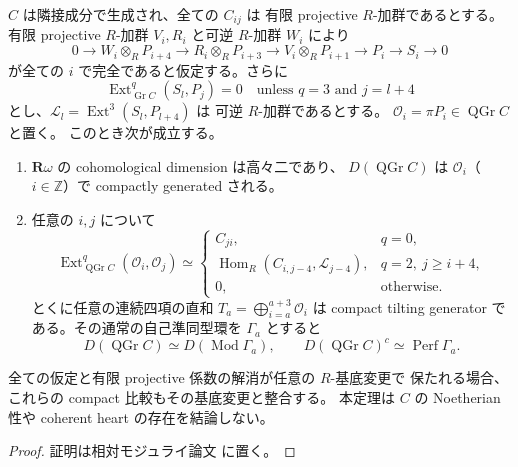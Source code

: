 \begin{theorem}
\label{thm:relative-cubic-tails-tilting}
$C$ は隣接成分で生成され、全ての $C_{ij}$ は
有限 projective $R$-加群であるとする。
有限 projective $R$-加群 $V_i,R_i$ と可逆 $R$-加群 $W_i$ により
\[
 0\longrightarrow W_i\otimes_RP_{i+4}
 \longrightarrow R_i\otimes_RP_{i+3}
 \longrightarrow V_i\otimes_RP_{i+1}
 \longrightarrow P_i\longrightarrow S_i\longrightarrow0
 \tag{CT-res}\label{eq:cubic-tails-simple-resolution}
\]
が全ての $i$ で完全であると仮定する。さらに
\[
 \operatorname{Ext}^q_{\operatorname{Gr}C}(S_l,P_j)=0
 \quad\text{unless }q=3\text{ and }j=l+4
 \tag{CT-dual}\label{eq:cubic-tails-relative-dual}
\]
とし、$\mathcal L_l=\operatorname{Ext}^3(S_l,P_{l+4})$ は
可逆 $R$-加群であるとする。
$\mathcal O_i=\pi P_i\in\operatorname{QGr}C$ と置く。
このとき次が成立する。
\begin{enumerate}
\item $\mathbf R\omega$ の cohomological dimension は高々二であり、
  $D(\operatorname{QGr}C)$ は $\mathcal O_i$（$i\in\mathbb Z$）で
  compactly generated される。
\item 任意の $i,j$ について
  \[
  \operatorname{Ext}^q_{\operatorname{QGr}C}
       (\mathcal O_i,\mathcal O_j)
   \simeq
   \begin{cases}
     C_{ji},&q=0,\\
     \operatorname{Hom}_R(C_{i,j-4},\mathcal L_{j-4}),&q=2,\ j\ge i+4,\\
     0,&\text{otherwise}.
   \end{cases}
  \tag{CT-coh}\label{eq:cubic-tails-line-cohomology}
  \]
  とくに任意の連続四項の直和
  $T_a=\bigoplus_{i=a}^{a+3}\mathcal O_i$ は compact tilting generator
  である。その通常の自己準同型環を $\Gamma_a$ とすると
  \[
    D(\operatorname{QGr}C)\simeq D(\operatorname{Mod}\Gamma_a),\qquad
    D(\operatorname{QGr}C)^c\simeq\operatorname{Perf}\Gamma_a.
    \tag{CT-Morita}\label{eq:cubic-tails-canonical-morita}
  \]
\end{enumerate}
全ての仮定と有限 projective 係数の解消が任意の $R$-基底変更で
保たれる場合、これらの compact 比較もその基底変更と整合する。
本定理は $C$ の Noetherian 性や coherent heart の存在を結論しない。
\end{theorem}
\begin{proof}
証明は相対モジュライ論文 \cite[\texttt{relative_cubic_tails}]{QuadricModuli2026} に置く。
\end{proof}

